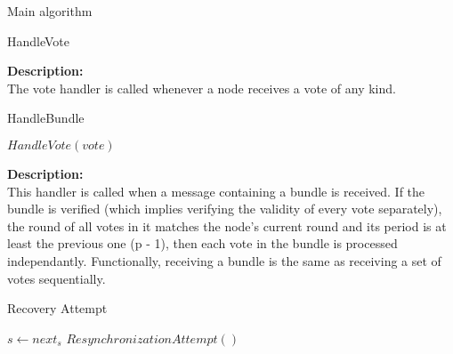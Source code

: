 \documentclass[10pt,a4paper]{article}
\begin{document}
\begin{section}{Main algorithm}
\begin{subsection}{HandleVote}
    
    \noindent \textbf{Description:}\\
The vote handler is called whenever a node receives a vote of any kind.

    
\end{subsection}


\begin{subsection}{HandleBundle}\label{ssect:HandleBundle}

    \begin{algorithm}[H]
        \begin{algorithmic}[1]

                    \State $HandleVote(vote)$
                \EndFor
            \EndIf

        \EndFunction
        \end{algorithmic}
        \caption{\underline{HandleBundle}}
    \end{algorithm}
    
    
    \noindent \textbf{Description:}\\
This handler is called when a message containing a bundle is received.
If the bundle is verified (which implies verifying the validity of every vote separately),
the round of all votes in it matches the node's current round and its period is at least the previous one (p - 1), 
then each vote in the bundle is processed independantly.
Functionally, receiving a bundle is the same as receiving a set of votes sequentially.

\end{subsection}


\begin{subsection}{Recovery Attempt}\label{ssect:Recovery}

    \begin{algorithm}[H]
        \begin{algorithmic}[1]

        \State $s \gets next_s$
        \State $ResynchronizationAttempt()$
    

\end{algorithmic}
\end{algorithm}
\end{subsection}
\end{section}
\end{document}
